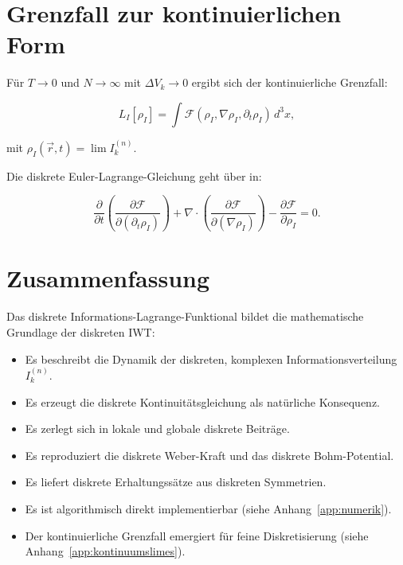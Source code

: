 \section{Grenzfall zur kontinuierlichen Form}
\label{sec:kontinuierlicher_grenzfall_lagrange}

Für \( T \to 0 \) und \( N \to \infty \) mit \( \Delta V_k \to 0 \) ergibt sich der kontinuierliche Grenzfall:

\[
L_I[\rho_I] = \int \mathcal{F}(\rho_I, \nabla \rho_I, \partial_t \rho_I) \, d^3x,
\]

mit \( \rho_I(\vec{r}, t) = \lim I_k^{(n)} \).

Die diskrete Euler-Lagrange-Gleichung geht über in:

\[
\frac{\partial}{\partial t} \left( \frac{\partial \mathcal{F}}{\partial (\partial_t \rho_I)} \right) + \nabla \cdot \left( \frac{\partial \mathcal{F}}{\partial (\nabla \rho_I)} \right) - \frac{\partial \mathcal{F}}{\partial \rho_I} = 0.
\]

\section{Zusammenfassung}
\label{sec:lagrange_zusammenfassung}

Das diskrete Informations-Lagrange-Funktional bildet die mathematische Grundlage der diskreten IWT:

\begin{itemize}
    \item Es beschreibt die Dynamik der diskreten, komplexen Informationsverteilung \( I_k^{(n)} \).
    \item Es erzeugt die diskrete Kontinuitätsgleichung als natürliche Konsequenz.
    \item Es zerlegt sich in lokale und globale diskrete Beiträge.
    \item Es reproduziert die diskrete Weber-Kraft und das diskrete Bohm-Potential.
    \item Es liefert diskrete Erhaltungssätze aus diskreten Symmetrien.
    \item Es ist algorithmisch direkt implementierbar (siehe Anhang~\ref{app:numerik}).
    \item Der kontinuierliche Grenzfall emergiert für feine Diskretisierung (siehe Anhang~\ref{app:kontinuumslimes}).
\end{itemize}